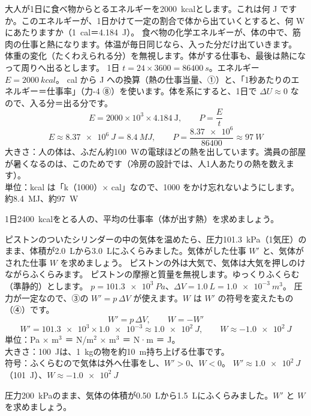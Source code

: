 \label{ph:熱-2:ex2}
\begin{phreidai}
大人が1日に食べ物からとるエネルギーを\qty{2000}{kcal}とします。これは何 J ですか。このエネルギーが、1日かけて一定の割合で体から出ていくとすると、何 W にあたりますか（\qty{1}{cal}＝\qty{4.184}{J}）。
\phbamen
食べ物の化学エネルギーが、体の中で、筋肉の仕事と熱になります。体温が毎日同じなら、入った分だけ出ていきます。
\phmushi
体重の変化（たくわえられる分）を無視します。体がする仕事も、最後は熱になって周りへ出るとします。
\phzu
1日 $t=24\times3600=\qty{86400}{s}$。エネルギー $E=\qty{2000}{kcal}$。
\phriyu
cal から J への換算（熱の仕事当量、①）と、「1秒あたりのエネルギー＝仕事率」（力-4 ⑧）を使います。体を系にすると、1日で $\Delta U\approx0$ なので、入る分＝出る分です。
\phtateru
\[E=2000\times10^3\times4.184\ \text{J},\qquad P=\frac{E}{t}\]
\phtoku
\[E\approx\qty{8.37e6}{J}=\qty{8.4}{MJ},\qquad P=\frac{\num{8.37e6}}{86400}\approx\qty{97}{W}\]
\phtashikame
大きさ：人の体は、ふだん約\qty{100}{W}の電球ほどの熱を出しています。満員の部屋が暑くなるのは、このためです（冷房の設計では、人1人あたりの熱を数えます）。\\
単位：kcal は「k（1000）× cal」なので、1000 をかけ忘れないようにします。
\kotae 約\qty{8.4}{MJ}、約\qty{97}{W}
\end{phreidai}
\begin{jibun}
1日\qty{2400}{kcal}をとる人の、平均の仕事率（体が出す熱）を求めましょう。
\end{jibun}

\label{ph:熱-2:ex3}
\begin{phreidai}[1気圧でふくらむ気体の仕事]
ピストンのついたシリンダーの中の気体を温めたら、圧力\qty{101.3}{kPa}（1気圧）のまま、体積が\qty{2.0}{L}から\qty{3.0}{L}にふくらみました。気体がした仕事 $W'$ と、気体がされた仕事 $W$ を求めましょう。
\phbamen
ピストンの外は大気で、気体は大気を押しのけながらふくらみます。
\phmushi
ピストンの摩擦と質量を無視します。ゆっくりふくらむ（準静的）とします。
\phzu
$p=\qty{101.3e3}{Pa}$、$\Delta V=\qty{1.0}{L}=\qty{1.0e-3}{m^3}$。
\phriyu
圧力が一定なので、③の $W'=p\,\Delta V$ が使えます。$W$ は $W'$ の符号を変えたもの（④）です。
\phtateru
\[W'=p\,\Delta V,\qquad W=-W'\]
\phtoku
\[W'=\num{101.3e3}\times\num{1.0e-3}\approx\qty{1.0e2}{J},\qquad W\approx-\qty{1.0e2}{J}\]
\phtashikame
単位：Pa × m$^3$ ＝ N/m$^2$ × m$^3$ ＝ N·m ＝ J。\\
大きさ：\qty{100}{J}は、\qty{1}{kg}の物を約\qty{10}{m}持ち上げる仕事です。\\
符号：ふくらむので気体は外へ仕事をし、$W'>0$、$W<0$。
\kotae $W'\approx\qty{1.0e2}{J}$（\qty{101}{J}）、$W\approx-\qty{1.0e2}{J}$
\end{phreidai}
\begin{jibun}
圧力\qty{200}{kPa}のまま、気体の体積が\qty{0.50}{L}から\qty{1.5}{L}にふくらみました。$W'$ と $W$ を求めましょう。
\end{jibun}

